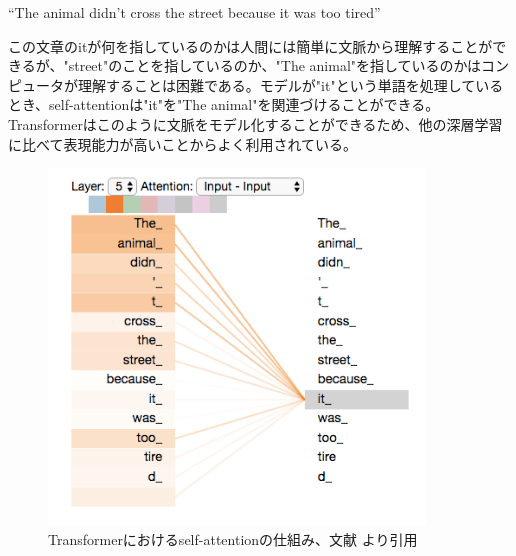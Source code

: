 “The animal didn't cross the street because it was too tired”

この文章のitが何を指しているのかは人間には簡単に文脈から理解することができるが、"street"のことを指しているのか、"The animal"を指しているのかはコンピュータが理解することは困難である。モデルが"it"という単語を処理しているとき、self-attentionは"it"を"The animal"を関連づけることができる\cite{TheIllus32:online}。Transformerはこのように文脈をモデル化することができるため、他の深層学習に比べて表現能力が高いことからよく利用されている。
\begin{figure}[h]
  \begin{center}
      \includegraphics[width=10cm]{img/transformer_self-attention.png}
      \caption{Transformerにおけるself-attentionの仕組み、文献\cite{TheIllus32:online} より引用}
      \label{img:transformer_self-attention}
  \end{center}
\end{figure}

